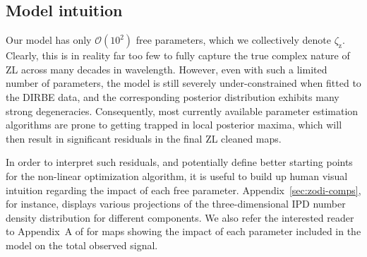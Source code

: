 \documentclass[twocolumn]{aa}
\begin{document}

\subsection{Model intuition}

Our model has only $\mathcal{O}(10^2)$ free
parameters, which we collectively denote
$\zeta_{\mathrm{z}}$. Clearly, this is in reality far too few to fully
capture the true complex nature of ZL across many decades in
wavelength. However, even with such a limited number of parameters,
the model is still severely under-constrained when fitted to the DIRBE
data, and the corresponding posterior distribution exhibits many
strong degeneracies. Consequently, most currently available parameter
estimation algorithms are prone to getting trapped in local posterior
maxima, which will then result in significant residuals in the
final ZL cleaned maps.

In order to interpret such residuals, and potentially define better
starting points for the non-linear optimization algorithm, it is
useful to build up human visual intuition regarding the impact of each
free parameter. Appendix~\ref{sec:zodi-comps}, for instance, displays various projections 
of the three-dimensional IPD number density 
distribution for different components. We also refer the interested reader 
to Appendix~A of \citet{SanPhD} for maps showing the 
impact of each parameter included in the model on the total observed 
signal.
\end{document}
